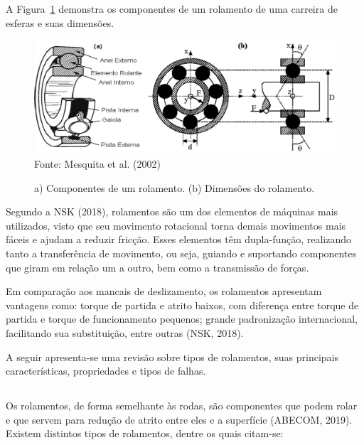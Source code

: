 \documentclass[
	12pt,				
	oneside,			
	a4paper,			
	english,			
	brazil,			
	]{abntex2ppgsi}
\begin{document}
A Figura~\ref{ComponentesRolamentos} demonstra os componentes de um rolamento de uma carreira de esferas e suas dimensões. 

\begin{figure}[!htb]
\centering
\caption{a) Componentes de um rolamento. (b) Dimensões do rolamento.}
\includegraphics[width=\textwidth,height=\textheight,keepaspectratio]{Figura1} \\
Fonte: Mesquita et al. (2002)
\label{ComponentesRolamentos}
\end{figure}

Segundo a NSK (2018), rolamentos são um dos elementos de máquinas mais utilizados, visto que seu movimento rotacional torna demais movimentos mais fáceis e ajudam a reduzir fricção. Esses elementos têm dupla-função, realizando tanto a transferência de movimento, ou seja, guiando e suportando componentes que giram em relação um a outro, bem como a transmissão de forças.

Em comparação aos mancais de deslizamento, os rolamentos apresentam vantagens como: torque de partida e atrito baixos, com diferença entre torque de partida e torque de funcionamento pequenos; grande padronização internacional, facilitando sua substituição, entre outras (NSK, 2018).

A seguir apresenta-se uma revisão sobre tipos de rolamentos, suas principais características, propriedades e tipos de falhas.

\subsection{}

Os rolamentos, de forma semelhante às rodas, são componentes que podem rolar  e que servem para redução de atrito entre eles e a superfície (ABECOM, 2019). Existem distintos tipos de rolamentos, dentre os quais citam-se:
\end{document}
